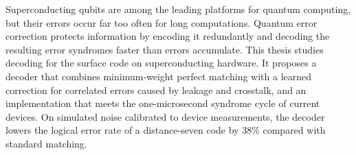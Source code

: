 Superconducting qubits are among the leading platforms for quantum computing, but their errors
occur far too often for long computations. Quantum error correction protects information by
encoding it redundantly and decoding the resulting error syndromes faster than errors accumulate.
This thesis studies decoding for the surface code on superconducting hardware. It proposes a
decoder that combines minimum-weight perfect matching with a learned correction for correlated
errors caused by leakage and crosstalk, and an implementation that meets the one-microsecond
syndrome cycle of current devices. On simulated noise calibrated to device measurements, the
decoder lowers the logical error rate of a distance-seven code by 38\% compared with standard
matching.
